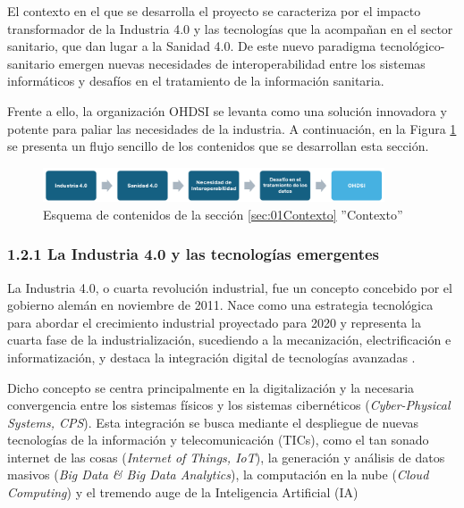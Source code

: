 El contexto en el que se desarrolla el proyecto se caracteriza por el impacto transformador de la Industria 4.0 y las tecnologías que la acompañan en el sector sanitario, que dan lugar a la Sanidad 4.0. De este nuevo paradigma tecnológico-sanitario emergen nuevas necesidades de interoperabilidad entre los sistemas informáticos y desafíos en el tratamiento de la información sanitaria.

Frente a ello, la organización OHDSI se levanta como una solución innovadora y potente para paliar las necesidades de la industria. A continuación, en la Figura \ref{fig:esquemaMarcoContextual} se presenta un flujo sencillo de los contenidos que se desarrollan esta sección.

\begin{figure}[H]
    \centering
    \includegraphics[width=0.90\textwidth]{figures/esquemaMarcoContextual.png}
    \caption{Esquema de contenidos de la sección \ref{sec:01Contexto} ''Contexto''}
    \label{fig:esquemaMarcoContextual}
\end{figure}


\subsubsection{1.2.1 La Industria 4.0 y las tecnologías emergentes}

La Industria 4.0, o cuarta revolución industrial, fue un concepto concebido por el gobierno alemán en noviembre de 2011. Nace como una estrategia tecnológica para abordar el crecimiento industrial proyectado para 2020 y representa la cuarta fase de la industrialización, sucediendo a la mecanización, electrificación e informatización, y destaca la integración digital de tecnologías avanzadas \cite{lasi2014industry}.

Dicho concepto se centra principalmente en la digitalización y la necesaria convergencia entre los sistemas físicos y los sistemas cibernéticos (\textit{Cyber-Physical Systems, CPS}). Esta integración se busca mediante el despliegue  de nuevas tecnologías de la información y telecomunicación (TICs), como el tan sonado internet de las cosas (\textit{Internet of Things, IoT}), la generación y análisis de datos masivos (\textit{Big Data \& Big Data Analytics}), la computación en la nube (\textit{Cloud Computing}) y el tremendo auge de la Inteligencia Artificial (IA) \cite{lasi2014industry, chen2020times, tortorella2020healthcare}

